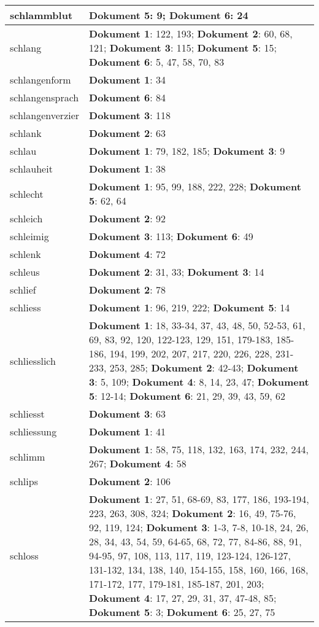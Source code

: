 \documentclass[a5paper]{article}
\begin{document}
\begin{longtable}[l]{|l|p{3in}|}
schlammblut & \textbf{Dokument 5}: 9; \textbf{Dokument 6}: 24 \\
\hline
schlang & \textbf{Dokument 1}: 122, 193; \textbf{Dokument 2}: 60, 68, 121; \textbf{Dokument 3}: 115; \textbf{Dokument 5}: 15; \textbf{Dokument 6}: 5, 47, 58, 70, 83 \\
\hline
schlangenform & \textbf{Dokument 1}: 34 \\
\hline
schlangensprach & \textbf{Dokument 6}: 84 \\
\hline
schlangenverzier & \textbf{Dokument 3}: 118 \\
\hline
schlank & \textbf{Dokument 2}: 63 \\
\hline
schlau & \textbf{Dokument 1}: 79, 182, 185; \textbf{Dokument 3}: 9 \\
\hline
schlauheit & \textbf{Dokument 1}: 38 \\
\hline
schlecht & \textbf{Dokument 1}: 95, 99, 188, 222, 228; \textbf{Dokument 5}: 62, 64 \\
\hline
schleich & \textbf{Dokument 2}: 92 \\
\hline
schleimig & \textbf{Dokument 3}: 113; \textbf{Dokument 6}: 49 \\
\hline
schlenk & \textbf{Dokument 4}: 72 \\
\hline
schleus & \textbf{Dokument 2}: 31, 33; \textbf{Dokument 3}: 14 \\
\hline
schlief & \textbf{Dokument 2}: 78 \\
\hline
schliess & \textbf{Dokument 1}: 96, 219, 222; \textbf{Dokument 5}: 14 \\
\hline
schliesslich & \textbf{Dokument 1}: 18, 33-34, 37, 43, 48, 50, 52-53, 61, 69, 83, 92, 120, 122-123, 129, 151, 179-183, 185-186, 194, 199, 202, 207, 217, 220, 226, 228, 231-233, 253, 285; \textbf{Dokument 2}: 42-43; \textbf{Dokument 3}: 5, 109; \textbf{Dokument 4}: 8, 14, 23, 47; \textbf{Dokument 5}: 12-14; \textbf{Dokument 6}: 21, 29, 39, 43, 59, 62 \\
\hline
schliesst & \textbf{Dokument 3}: 63 \\
\hline
schliessung & \textbf{Dokument 1}: 41 \\
\hline
schlimm & \textbf{Dokument 1}: 58, 75, 118, 132, 163, 174, 232, 244, 267; \textbf{Dokument 4}: 58 \\
\hline
schlips & \textbf{Dokument 2}: 106 \\
\hline
schloss & \textbf{Dokument 1}: 27, 51, 68-69, 83, 177, 186, 193-194, 223, 263, 308, 324; \textbf{Dokument 2}: 16, 49, 75-76, 92, 119, 124; \textbf{Dokument 3}: 1-3, 7-8, 10-18, 24, 26, 28, 34, 43, 54, 59, 64-65, 68, 72, 77, 84-86, 88, 91, 94-95, 97, 108, 113, 117, 119, 123-124, 126-127, 131-132, 134, 138, 140, 154-155, 158, 160, 166, 168, 171-172, 177, 179-181, 185-187, 201, 203; \textbf{Dokument 4}: 17, 27, 29, 31, 37, 47-48, 85; \textbf{Dokument 5}: 3; \textbf{Dokument 6}: 25, 27, 75 \\

\end{longtable}
\end{document}
